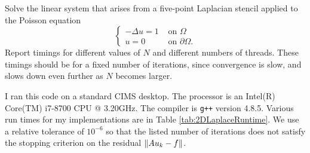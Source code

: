 \begin{questions}
{  Solve the linear system that arises from a five-point Laplacian stencil applied
  to the Poisson equation
  \[
  \begin{cases}
  -\Delta u = 1 &\text{ on } \Omega \\
  u=0 &\text{ on } \partial\Omega.
  \end{cases}
  \]
  Report timings for different values of $N$ and different numbers of threads. These
  timings should be for a fixed number of iterations, since convergence is slow,
  and slows down even further as $N$ becomes larger.
}

\begin{solution}
    I ran this code on a standard CIMS desktop. The processor is an
    Intel(R) Core(TM) i7-8700 CPU @ 3.20GHz. The compiler is \texttt{g++}
    version 4.8.5. Various run times for my implementations are in Table
    \ref{tab:2DLaplaceRuntime}. We use a relative tolerance of $10^{-6}$
    so that the listed number of iterations does not satisfy the stopping
    criterion on the residual $\left \| Au_k - f \right \|$.


\end{solution}
\end{questions}
